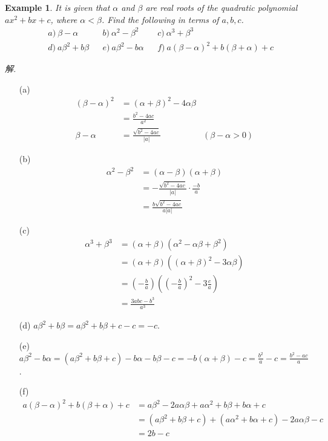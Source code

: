 \documentclass[12pt]{article}
\newtheorem{example}{Example}
\begin{document}
    \begin{example}
        It is given that $\alpha$ and $\beta$ are real roots of the quadratic polynomial $ax^2+bx+c$, where $\alpha<\beta$. Find the following in terms of $a,b,c$.\begin{align*}
            &a)\ \beta-\alpha&&b)\ \alpha^2-\beta^2&&c)\ \alpha^3+\beta^3\\
            &d)\ a\beta^2+b\beta&&e)\ a\beta^2-b\alpha&&f)\ a(\beta-\alpha)^2+b(\beta+\alpha)+c
        \end{align*}
    \end{example}

    \textit{ 解.}\begin{enumerate}
        \item[(a)] \begin{align*}
            (\beta-\alpha)^2&=(\alpha+\beta)^2-4\alpha\beta\\
            &=\frac{b^2-4ac}{a^2}\\
            \beta-\alpha&=\frac{\sqrt{b^2-4ac}}{|a|}&(\beta-\alpha>0)
        \end{align*} 
        \item[(b)] \begin{align*}
            \alpha^2-\beta^2&=(\alpha-\beta)(\alpha+\beta)\\
            &=-\frac{\sqrt{b^2-4ac}}{|a|}\cdot \frac{-b}{a}\\
            &=\frac{b\sqrt{b^2-4ac}}{a|a|}
        \end{align*}
        \item[(c)] \begin{align*}
            \alpha^3+\beta^3&=(\alpha+\beta)(\alpha^2-\alpha\beta+\beta^2)\\
            &=(\alpha+\beta)((\alpha+\beta)^2-3\alpha\beta)\\
            &=(-\frac{b}{a})((-\frac{b}{a})^2-3\frac{c}{a})\\
            &=\frac{3abc-b^3}{a^3}
        \end{align*}
        \item[(d)] $a\beta^2+b\beta=a\beta^2+b\beta+c-c=-c$.
        \item[(e)] $\displaystyle a\beta^2-b\alpha=(a\beta^2+b\beta+c)-b\alpha-b\beta-c=-b(\alpha+\beta)-c=\frac{b^2}{a}-c=\frac{b^2-ac}{a}$.
        \item[(f)] \begin{align*}
            a(\beta-\alpha)^2+b(\beta+\alpha)+c&=a\beta^2-2a\alpha\beta+a\alpha^2+b\beta+b\alpha+c\\
            &=(a\beta^2+b\beta+c)+(a\alpha^2+b\alpha+c)-2a\alpha\beta-c\\
            &=2b-c
        \end{align*}
    \end{enumerate}
\end{document}
